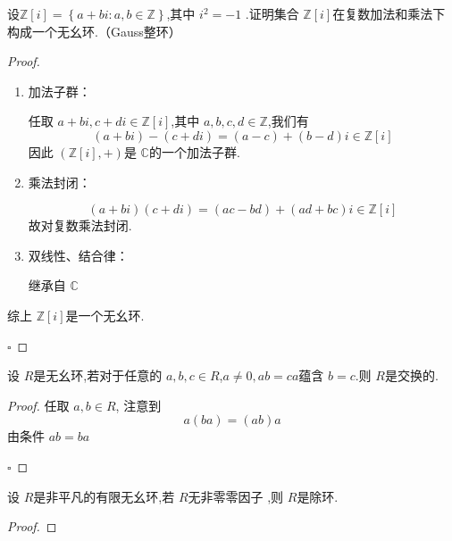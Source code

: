 \documentclass[lang=cn,12pt,color=green,fontset=none,pad]{elegantbook}
\begin{document}
\begin{problemset}
    \item \label{ex:Gauss domain}设\(  \mathbb{Z} [i]=  \left\{ a+ bi:a,b \in \mathbb{Z}  \right\}  \),其中 \(  i^{2}= -1  \)  .证明集合 \(  \mathbb{Z} [i]  \)在复数加法和乘法下构成一个无幺环.（Gauss整环） 
    \begin{proof}
        \begin{enumerate}
            \item 加法子群：
            
            任取 \(  a+ bi,c+  d i\in \mathbb{Z} [i]  \),其中 \(  a,b,c,d \in \mathbb{Z}   \),我们有 \[
            \left( a+ bi \right)-\left( c+  d i \right) =  \left( a-c \right)+ \left( b-d \right) i \in \mathbb{Z} [i]    
            \]因此 \(  \left( \mathbb{Z} [i],+  \right)   \)是 \(  \mathbb{C}   \)的一个加法子群.  
            \item 乘法封闭：
            
             \[
             \left( a+ bi \right)\left( c+ d i  \right) =  \left( ac-bd \right)+ \left( ad+ bc \right)i \in \mathbb{Z} [i]    
             \]故对复数乘法封闭.

             \item 双线性、结合律：
             
             继承自 \(  \mathbb{C}   \) 
        \end{enumerate}
        综上 \(  \mathbb{Z} [i]  \)是一个无幺环. 
    
        \hfill $\square$
    \end{proof}
    \item 设 \(  R  \)是无幺环,若对于任意的 \(  a,b,c \in R  \),\(  a\neq 0,ab= ca  \)蕴含 \(  b= c  \).则 \(  R  \)是交换的.
    \begin{proof}
        任取 \(  a,b \in R  \), 注意到 \[
         a\left( ba \right)= \left( ab \right)a  
         \]由条件 \(  ab= ba  \) 
        
        \hfill $\square$
    \end{proof}     

    \item 设 \(  R  \)是非平凡的有限无幺环,若 \(  R  \)无非零零因子  ,则 \(  R  \)是除环.  
    \begin{proof}
       

\end{proof}
\end{problemset}
\end{document}
